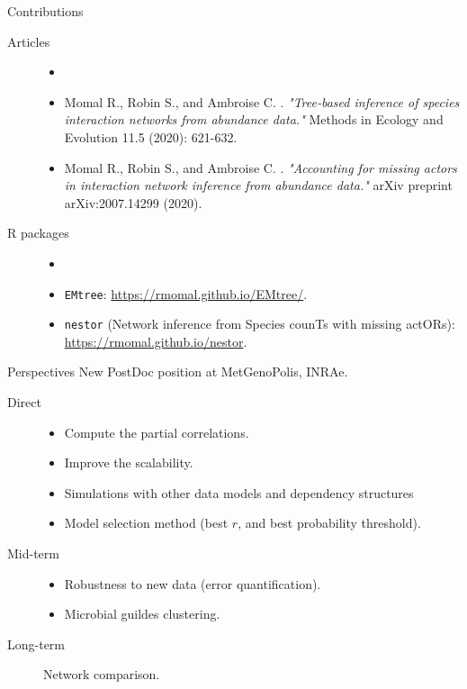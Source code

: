 \documentclass[11pt]{beamer}
\begin{document}
 \begin{frame}{Contributions}
\begin{description}
\item[Articles] \begin{itemize}
\item[]\vspace{-0.5cm}\small
\item Momal R.,  Robin S., and Ambroise C. . \textit{"Tree‐based inference of species interaction networks from abundance data."} Methods in Ecology and Evolution 11.5 (2020): 621-632.\vspace{0.2cm}
\item  Momal R.,  Robin S., and Ambroise C. . \textit{"Accounting for missing actors in interaction network inference from abundance data."}  arXiv preprint arXiv:2007.14299 (2020).
\end{itemize}\vspace{0.5cm}
\item[R packages] \begin{itemize}
\item[]\vspace{-0.5cm}\normalsize
\item \texttt{EMtree}: \url{https://rmomal.github.io/EMtree/}.\vspace{0.2cm}
\item \texttt{nestor} \small(Network inference from Species counTs with missing actORs): \normalsize \url{https://rmomal.github.io/nestor}.
\end{itemize}
\end{description}  
\end{frame}
\begin{frame}{Perspectives}
New PostDoc position at MetGenoPolis, INRAe.\\
\bigskip

\begin{description}
\item[Direct]\begin{itemize}
\item Compute the partial correlations.
 \item Improve the scalability.
 \item Simulations with other data models and dependency structures
 \item Model selection method (best $r$, and best probability threshold).
 \end{itemize}\vspace{0.5cm}
\item[Mid-term]\begin{itemize}
\item Robustness to new data (error quantification).
\item Microbial guildes clustering.
\end{itemize} \vspace{0.5cm}
\item[Long-term] Network comparison.
\end{description}
\end{frame}
\end{document}
